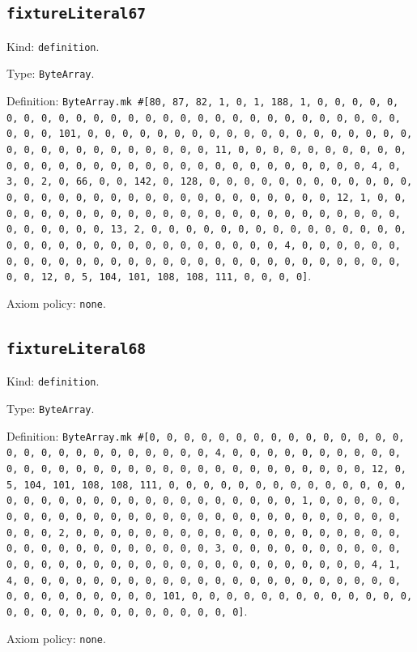 \documentclass[11pt]{article}
\begin{document}
\subsection*{\texttt{fixtureLiteral67}}
\noindent Kind: \texttt{definition}.\par
\noindent Type: \texttt{ByteArray}.\par
\noindent Definition: \texttt{ByteArray.mk \#[80, 87, 82, 1, 0, 1, 188, 1, 0, 0, 0, 0, 0, 0, 0, 0, 0, 0, 0, 0, 0, 0, 0, 0, 0, 0, 0, 0, 0, 0, 0, 0, 0, 0, 0, 0, 0, 0, 0, 101, 0, 0, 0, 0, 0, 0, 0, 0, 0, 0, 0, 0, 0, 0, 0, 0, 0, 0, 0, 0, 0, 0, 0, 0, 0, 0, 0, 0, 0, 0, 0, 11, 0, 0, 0, 0, 0, 0, 0, 0, 0, 0, 0, 0, 0, 0, 0, 0, 0, 0, 0, 0, 0, 0, 0, 0, 0, 0, 0, 0, 0, 0, 0, 4, 0, 3, 0, 2, 0, 66, 0, 0, 142, 0, 128, 0, 0, 0, 0, 0, 0, 0, 0, 0, 0, 0, 0, 0, 0, 0, 0, 0, 0, 0, 0, 0, 0, 0, 0, 0, 0, 0, 0, 0, 0, 0, 12, 1, 0, 0, 0, 0, 0, 0, 0, 0, 0, 0, 0, 0, 0, 0, 0, 0, 0, 0, 0, 0, 0, 0, 0, 0, 0, 0, 0, 0, 0, 0, 0, 13, 2, 0, 0, 0, 0, 0, 0, 0, 0, 0, 0, 0, 0, 0, 0, 0, 0, 0, 0, 0, 0, 0, 0, 0, 0, 0, 0, 0, 0, 0, 0, 0, 4, 0, 0, 0, 0, 0, 0, 0, 0, 0, 0, 0, 0, 0, 0, 0, 0, 0, 0, 0, 0, 0, 0, 0, 0, 0, 0, 0, 0, 0, 0, 0, 12, 0, 5, 104, 101, 108, 108, 111, 0, 0, 0, 0]}.\par
\noindent Axiom policy: \texttt{none}.\par
\subsection*{\texttt{fixtureLiteral68}}
\noindent Kind: \texttt{definition}.\par
\noindent Type: \texttt{ByteArray}.\par
\noindent Definition: \texttt{ByteArray.mk \#[0, 0, 0, 0, 0, 0, 0, 0, 0, 0, 0, 0, 0, 0, 0, 0, 0, 0, 0, 0, 0, 0, 0, 0, 0, 0, 0, 4, 0, 0, 0, 0, 0, 0, 0, 0, 0, 0, 0, 0, 0, 0, 0, 0, 0, 0, 0, 0, 0, 0, 0, 0, 0, 0, 0, 0, 0, 0, 0, 12, 0, 5, 104, 101, 108, 108, 111, 0, 0, 0, 0, 0, 0, 0, 0, 0, 0, 0, 0, 0, 0, 0, 0, 0, 0, 0, 0, 0, 0, 0, 0, 0, 0, 0, 0, 0, 0, 0, 1, 0, 0, 0, 0, 0, 0, 0, 0, 0, 0, 0, 0, 0, 0, 0, 0, 0, 0, 0, 0, 0, 0, 0, 0, 0, 0, 0, 0, 0, 0, 0, 2, 0, 0, 0, 0, 0, 0, 0, 0, 0, 0, 0, 0, 0, 0, 0, 0, 0, 0, 0, 0, 0, 0, 0, 0, 0, 0, 0, 0, 0, 0, 0, 3, 0, 0, 0, 0, 0, 0, 0, 0, 0, 0, 0, 0, 0, 0, 0, 0, 0, 0, 0, 0, 0, 0, 0, 0, 0, 0, 0, 0, 0, 0, 0, 4, 1, 4, 0, 0, 0, 0, 0, 0, 0, 0, 0, 0, 0, 0, 0, 0, 0, 0, 0, 0, 0, 0, 0, 0, 0, 0, 0, 0, 0, 0, 0, 0, 0, 101, 0, 0, 0, 0, 0, 0, 0, 0, 0, 0, 0, 0, 0, 0, 0, 0, 0, 0, 0, 0, 0, 0, 0, 0, 0, 0, 0]}.\par
\noindent Axiom policy: \texttt{none}.\par
\end{document}
